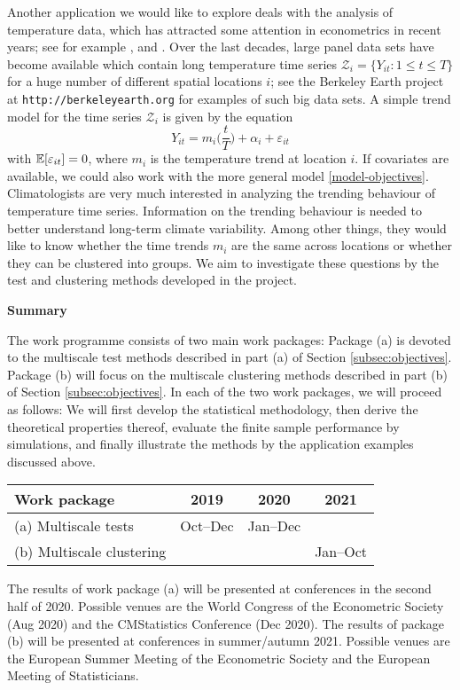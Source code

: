 \documentclass[a4paper,12pt]{article}
\begin{document}
Another application we would like to explore deals with the analysis of temperature data, which has attracted some attention in econometrics in recent years; see for example \cite{Gao2006}, \cite{Atak2011} and \cite{Davidson2016}. Over the last decades, large panel data sets have become available which contain long temperature time series $\mathcal{Z}_i = \{ Y_{it}: 1 \le t \le T \}$ for a huge number of different spatial locations $i$; see the Berkeley Earth project at \texttt{http://berkeleyearth.org} for examples of such big data sets. A simple trend model for the time series $\mathcal{Z}_i$ is given by the equation
\[ Y_{it} = m_i\Big(\frac{t}{T}\Big) + \alpha_i + \varepsilon_{it} \]
with $\mathbb{E}[\varepsilon_{it}] = 0$, where $m_i$ is the temperature trend at location $i$. %
If covariates are available, we could also work with the more general model \eqref{model-objectives}. Climatologists are very much interested in analyzing the trending behaviour of temperature time series. Information on the trending behaviour is needed to better understand long-term climate variability.  Among other things, they would like to know whether the time trends $m_i$ are the same across locations or whether they can be clustered into groups. We aim to investigate these questions by the test and clustering methods developed in the project. 
\vspace{10pt}


\noindent \textbf{Summary} 
\vspace{10pt}


\noindent The work programme consists of two main work packages: Package (a) is devoted to the multiscale test methods described in part (a) of Section \ref{subsec:objectives}. Package (b) will focus on the multiscale clustering methods described in part (b) of Section \ref{subsec:objectives}. In each of the two work packages, we will proceed as follows: We will first develop the statistical methodology, then derive the theoretical properties thereof, evaluate the finite sample performance by simulations, and finally illustrate the methods by the application examples discussed above. 
\begin{center}
\begin{tabular}{l c c c}
\hspace{0.5cm} \textbf{Work package}  & {\bf 2019} & {\bf 2020} & {\bf 2021} \\
\hline 
(a) Multiscale tests & Oct--Dec & Jan--Dec & \\
(b) Multiscale clustering & & & Jan--Oct
\end{tabular}
\end{center}
\noindent The results of work package (a) will be presented at conferences in the second half of 2020. Possible venues are the World Congress of the Econometric Society (Aug 2020) and the CMStatistics Conference (Dec 2020). The results of package (b) will be presented at conferences in summer/autumn 2021. Possible venues are the European Summer Meeting of the Econometric Society and the European Meeting of Statisticians.
\end{document}
